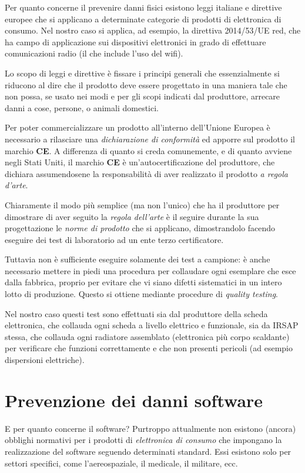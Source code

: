 \documentclass[12pt,a4paper,twoside,titlepage]{book}
\begin{document}
Per quanto concerne il prevenire danni fisici esistono leggi italiane e direttive europee che si applicano 
a determinate categorie di prodotti di elettronica di consumo. Nel nostro caso si applica, ad esempio, la
direttiva 2014/53/UE \acrshort{red}, che ha campo di applicazione sui dispositivi elettronici in grado di 
effettuare comunicazioni radio (il che include l'uso del \Gls{wifi}). 

Lo scopo di leggi e direttive è fissare i principi generali che essenzialmente si riducono al dire che 
il prodotto deve essere progettato in una maniera tale che non possa, se usato nei modi e per gli scopi 
indicati dal produttore, arrecare danni a cose, persone, o animali domestici. 

Per poter commercializzare un prodotto all'interno dell'Unione Europea è necessario a rilasciare una 
\textit{dichiarazione di conformità} ed apporre sul prodotto il marchio \textbf{CE}. A differenza di 
quanto si creda comunemente, e di quanto avviene negli Stati Uniti, il marchio \textbf{CE} è 
un'autocertificazione del produttore, che dichiara assumendosene la responsabilità di aver realizzato 
il prodotto \textit{a regola d'arte}. 

Chiaramente il modo più semplice (ma non l'unico) che ha il produttore per dimostrare di aver seguito la
\textit{regola dell'arte} è il seguire durante la sua progettazione le \textit{norme di prodotto} che si 
applicano, dimostrandolo facendo eseguire dei test di laboratorio ad un ente terzo certificatore. 

Tuttavia non è sufficiente eseguire solamente dei test a campione: è anche necessario mettere 
in piedi una procedura per collaudare ogni esemplare che esce dalla fabbrica, proprio per evitare che vi siano 
difetti sistematici in un intero lotto di produzione. Questo si ottiene mediante procedure di \textit{quality testing}. 

Nel nostro caso questi test sono effettuati sia dal produttore della scheda elettronica, 
che collauda ogni scheda a livello elettrico e funzionale, sia da IRSAP stessa, che collauda ogni radiatore 
assemblato (elettronica più corpo scaldante) per verificare che funzioni correttamente e che non presenti 
pericoli (ad esempio dispersioni elettriche). 

\section{Prevenzione dei danni software}

E per quanto concerne il software? Purtroppo attualmente non esistono (ancora) obblighi normativi per 
i prodotti di \textit{elettronica di consumo} che impongano la realizzazione del software seguendo determinati 
standard. Essi esistono solo per settori specifici, come l'aereospaziale, il medicale, il militare, ecc. 
\end{document}
